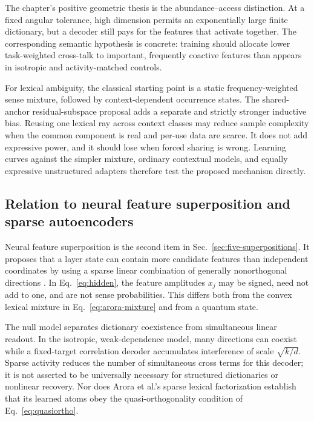 \documentclass[
  aps,
  reprint,
  superscriptaddress,
  floatfix,
  nofootinbib,
  longbibliography
]{revtex4-2}
\begin{document}
The chapter's positive geometric thesis is the abundance--access distinction.
At a fixed angular tolerance, high dimension permits an exponentially large
finite dictionary, but a decoder still pays for the features that activate
together.  The corresponding semantic hypothesis is concrete: training should
allocate lower task-weighted cross-talk to important, frequently coactive
features than appears in isotropic and activity-matched controls.

For lexical ambiguity, the classical starting point is a static
frequency-weighted sense mixture, followed by context-dependent occurrence
states.  The shared-anchor residual-subspace proposal adds a separate and
strictly stronger inductive bias.  Reusing one lexical ray across context
classes may reduce sample complexity when the common component is real and
per-use data are scarce.  It does not add expressive power, and it should lose
when forced sharing is wrong.  Learning curves against the simpler mixture,
ordinary contextual models, and equally expressive unstructured adapters
therefore test the proposed mechanism directly.

\subsection{Relation to neural feature superposition and sparse autoencoders}
\label{sec:superposition}

Neural feature superposition is the second item in
Sec.~\ref{sec:five-superpositions}.  It proposes that a layer state can contain
more candidate features than independent coordinates by using a sparse linear
combination of generally nonorthogonal directions
\cite{elhage2022superposition,bricken2023monosemanticity}.  In
Eq.~\eqref{eq:hidden}, the feature amplitudes $x_j$ may be signed, need not add
to one, and are not sense probabilities.  This differs both from the convex
lexical mixture in Eq.~\eqref{eq:arora-mixture} and from a quantum state.

The null model separates dictionary coexistence from simultaneous linear
readout.  In the isotropic, weak-dependence model, many directions can coexist
while a fixed-target correlation decoder accumulates interference of scale
$\sqrt{k/d}$.  Sparse activity reduces the number of simultaneous cross terms
for this decoder; it is not asserted to be universally necessary for
structured dictionaries or nonlinear recovery.  Nor does Arora et al.'s
sparse lexical factorization establish that its learned atoms obey the
quasi-orthogonality condition of Eq.~\eqref{eq:quasiortho}.
\end{document}
